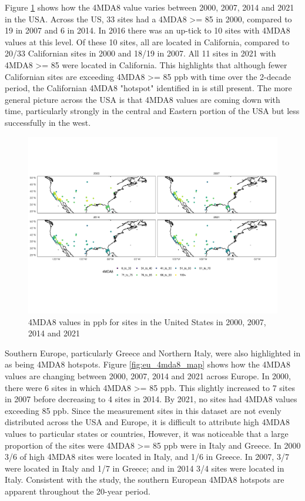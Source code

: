 \documentclass[journal abbreviation, manuscript]{copernicus}
\begin{document}
Figure \ref{fig:us_4mda8_map} shows how the 4MDA8 value varies between 2000, 2007, 2014 and 2021 in the USA. Across the US, 33 sites had a 4MDA8 >= 85 in 2000, compared to 19 in 2007 and 6 in 2014. In 2016 there was an up-tick to 10 sites with 4MDA8 values at this level. Of these 10 sites, all are located in California, compared to 20/33 Californian sites in 2000 and 18/19 in 2007. All 11 sites in 2021 with 4MDA8 >= 85 were located in California. This highlights that although fewer Californian sites are exceeding 4MDA8 >= 85 ppb with time over the 2-decade period, the Californian 4MDA8 "hotspot" identified in \cite{fleming_2018} is still present. The more general picture across the USA is that 4MDA8 values are coming down with time, particularly strongly in the central and Eastern portion of the USA but less successfully in the west.

\begin{figure}[h]
\includegraphics[width=12cm]{figures/f11_4mda8_us.pdf}
\caption{4MDA8 values in ppb for sites in the United States in 2000, 2007, 2014 and 2021}
\label{fig:us_4mda8_map}
\end{figure}

Southern Europe, particularly Greece and Northern Italy, were also highlighted in \cite{fleming_2018} as being 4MDA8 hotspots. Figure \ref{fig:eu_4mda8_map} shows how the 4MDA8 values are changing between 2000, 2007, 2014 and 2021 across Europe. In 2000, there were 6 sites in which 4MDA8 >= 85 ppb. This slightly increased to 7 sites in 2007 before decreasing to 4 sites in 2014. By 2021, no sites had 4MDA8 values exceeding 85 ppb. Since the measurement sites in this dataset are not evenly distributed across the USA and Europe, it is difficult to attribute high 4MDA8 values to particular states or countries, However, it was noticeable that a large proportion of the sites were 4MDA8 >= 85 ppb were in Italy and Greece. In 2000 3/6 of high 4MDA8 sites were located in Italy, and 1/6 in Greece. In 2007, 3/7 were located in Italy and 1/7 in Greece; and in 2014 3/4 sites were located in Italy. Consistent with the \cite{fleming_2018} study, the southern European 4MDA8 hotspots are apparent throughout the 20-year period. 
\end{document}
